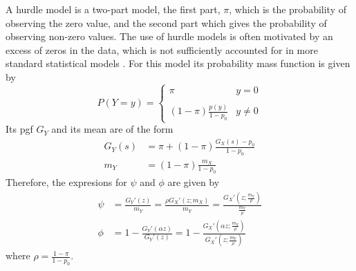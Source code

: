 \documentclass[12pt,a4paper]{article}
\theoremstyle{plain}%
\theoremstyle{definition}
\theoremstyle{remark}
\begin{document}
	A hurdle model is a two-part model, 
	the first part, $\pi$, which is the probability of observing the  zero value, and the second part which gives the probability of observing non-zero values. 
	The use of hurdle models is often motivated by an excess of zeros in the data, which is not sufficiently accounted for in more standard statistical models \cite{johnson2005univariate}. 
	For this model its probability mass function is given by
	\begin{equation*}\label{hd}
	P(Y=y)= \left\{ \begin{array}{lc}
	\pi & y=0 \\
	\\ (1-\pi)\frac{p(y)}{1-p_0}  & y\neq 0
	\end{array}
	\right.
	\end{equation*}
	Its pgf $G_Y$ and its mean are of the form
	\begin{equation*}
	\begin{split}
	G_Y(s)&=\pi+(1-\pi)\frac{G_X(s)-p_0}{1-p_0}\\
	m_Y&=(1-\pi)\frac{m_X}{1-p_0}
	\end{split}
	\end{equation*}
	Therefore, the expresions for $\psi$ and $\phi$ are given by
	\begin{equation}
	\begin{split}
	\psi&= \frac{G_Y'(z)}{m_Y}= \frac{\rho G_X'(z;m_X)}{ m_Y} =\frac{G_X'\left( z;\frac{m_Y}{\rho}\right) }{\frac{m_Y}{\rho}}\\
	\phi&=1-\frac{G_Y'(\alpha z)}{G_Y'(z)}=1-\frac{G_X'\left( \alpha z;\frac{m_Y}{\rho}\right) }
	{G_X'\left( z;\frac{m_Y}{\rho}\right) } 
	\end{split}
	\end{equation}
	where $\rho=\frac{1-\pi}{1-p_0}$.
	
\end{document}

